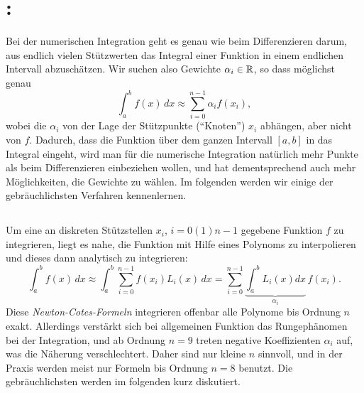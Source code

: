 \clearpage
{\raggedbottom
  
}
  \clearpage

\section{: }

Bei der numerischen Integration geht es genau wie beim Differenzieren
darum, aus endlich vielen Stützwerten das Integral einer Funktion in
einem endlichen Intervall abzuschätzen. Wir suchen also Gewichte
$\alpha_{i}\in\mathbb{R}$, so dass möglichst genau
\begin{equation}
  \int_a^b f(x)\, dx \approx \sum_{i=0}^{n-1} \alpha_if(x_i),
\end{equation}
wobei die $\alpha_i$ von der Lage der Stützpunkte ("`Knoten"') $x_i$
abhängen, aber nicht von $f$. Dadurch, dass die Funktion über dem
ganzen Intervall $[a,b]$ in das Integral eingeht, wird man für die
numerische Integration natürlich mehr Punkte als beim Differenzieren
einbeziehen wollen, und hat dementsprechend auch mehr Möglichkeiten,
die Gewichte zu wählen. Im folgenden werden wir einige der
gebräuchlichsten Verfahren kennenlernen.

\subsection{}

Um eine an diskreten Stützstellen $x_i$, $i=0(1)n-1$ gegebene Funktion
$f$ zu integrieren, liegt es nahe, die Funktion mit Hilfe eines
Polynoms zu interpolieren und dieses dann analytisch zu integrieren:
\begin{equation}
  \int_a^b f(x)\, dx \approx
  \int_a^b \sum_{i=0}^{n-1} f(x_i) L_i(x) \, dx = \sum_{i=0}^{n-1}
  \underbrace{\int_a^b
  L_i(x) dx}_{\alpha_i}\, f(x_i).
\end{equation}
Diese \emph{Newton-Cotes-Formeln} integrieren offenbar alle Polynome
bis Ordnung $n$ exakt. Allerdings verstärkt sich bei allgemeinen
Funktion das Rungephänomen bei der Integration, und ab Ordnung $n=9$
treten negative Koeffizienten $\alpha_i$ auf, was die Näherung
verschlechtert. Daher sind nur kleine $n$ sinnvoll, und in der Praxis
werden meist nur Formeln bis Ordnung $n=8$ benutzt. Die
gebräuchlichsten werden im folgenden kurz diskutiert.

